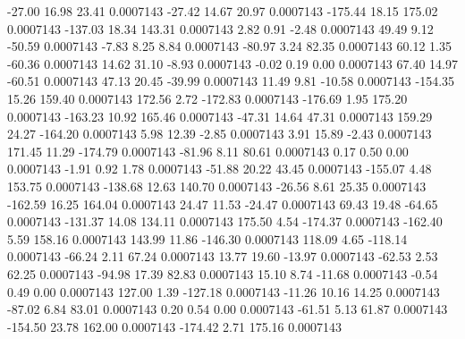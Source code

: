       -27.00       16.98       23.41     0.0007143
      -27.42       14.67       20.97     0.0007143
     -175.44       18.15      175.02     0.0007143
     -137.03       18.34      143.31     0.0007143
        2.82        0.91       -2.48     0.0007143
       49.49        9.12      -50.59     0.0007143
       -7.83        8.25        8.84     0.0007143
      -80.97        3.24       82.35     0.0007143
       60.12        1.35      -60.36     0.0007143
       14.62       31.10       -8.93     0.0007143
       -0.02        0.19        0.00     0.0007143
       67.40       14.97      -60.51     0.0007143
       47.13       20.45      -39.99     0.0007143
       11.49        9.81      -10.58     0.0007143
     -154.35       15.26      159.40     0.0007143
      172.56        2.72     -172.83     0.0007143
     -176.69        1.95      175.20     0.0007143
     -163.23       10.92      165.46     0.0007143
      -47.31       14.64       47.31     0.0007143
      159.29       24.27     -164.20     0.0007143
        5.98       12.39       -2.85     0.0007143
        3.91       15.89       -2.43     0.0007143
      171.45       11.29     -174.79     0.0007143
      -81.96        8.11       80.61     0.0007143
        0.17        0.50        0.00     0.0007143
       -1.91        0.92        1.78     0.0007143
      -51.88       20.22       43.45     0.0007143
     -155.07        4.48      153.75     0.0007143
     -138.68       12.63      140.70     0.0007143
      -26.56        8.61       25.35     0.0007143
     -162.59       16.25      164.04     0.0007143
       24.47       11.53      -24.47     0.0007143
       69.43       19.48      -64.65     0.0007143
     -131.37       14.08      134.11     0.0007143
      175.50        4.54     -174.37     0.0007143
     -162.40        5.59      158.16     0.0007143
      143.99       11.86     -146.30     0.0007143
      118.09        4.65     -118.14     0.0007143
      -66.24        2.11       67.24     0.0007143
       13.77       19.60      -13.97     0.0007143
      -62.53        2.53       62.25     0.0007143
      -94.98       17.39       82.83     0.0007143
       15.10        8.74      -11.68     0.0007143
       -0.54        0.49        0.00     0.0007143
      127.00        1.39     -127.18     0.0007143
      -11.26       10.16       14.25     0.0007143
      -87.02        6.84       83.01     0.0007143
        0.20        0.54        0.00     0.0007143
      -61.51        5.13       61.87     0.0007143
     -154.50       23.78      162.00     0.0007143
     -174.42        2.71      175.16     0.0007143
